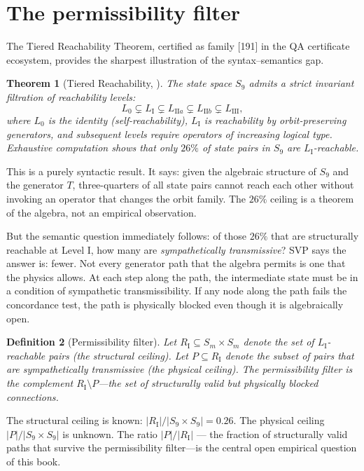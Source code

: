 \documentclass[11pt,a4paper]{article}
\newtheorem{theorem}{Theorem}
\newtheorem{definition}[theorem]{Definition}
\begin{document}
\section{The permissibility filter}

The Tiered Reachability Theorem, certified as family [191] in the QA
certificate ecosystem, provides the sharpest illustration of the
syntax--semantics gap.

\begin{theorem}[Tiered Reachability, {\cite[Cert 191]{qa_bateson}}]
The state space $S_9$ admits a strict invariant filtration of
reachability levels:
\[
L_0 \subsetneq L_{\mathrm{I}} \subsetneq L_{\mathrm{II}a}
\subsetneq L_{\mathrm{II}b} \subsetneq L_{\mathrm{III}},
\]
where $L_0$ is the identity (self-reachability), $L_{\mathrm{I}}$ is
reachability by orbit-preserving generators, and subsequent levels
require operators of increasing logical type. Exhaustive computation
shows that only $26\%$ of state pairs in $S_9$ are
$L_{\mathrm{I}}$-reachable.
\end{theorem}

This is a purely syntactic result. It says: given the algebraic structure
of $S_9$ and the generator $T$, three-quarters of all state pairs cannot
reach each other without invoking an operator that changes the orbit
family. The $26\%$ ceiling is a theorem of the algebra, not an empirical
observation.

But the semantic question immediately follows: of those $26\%$ that are
structurally reachable at Level I, how many are \emph{sympathetically
transmissive}? SVP says the answer is: fewer. Not every generator path
that the algebra permits is one that the physics allows. At each step
along the path, the intermediate state must be in a condition of
sympathetic transmissibility. If any node along the path fails the
concordance test, the path is physically blocked even though it is
algebraically open.

\begin{definition}[Permissibility filter]
Let $R_{\mathrm{I}} \subseteq S_m \times S_m$ denote the set of
$L_{\mathrm{I}}$-reachable pairs (the structural ceiling). Let
$P \subseteq R_{\mathrm{I}}$ denote the subset of pairs that are
sympathetically transmissive (the physical ceiling). The
\emph{permissibility filter} is the complement
$R_{\mathrm{I}} \setminus P$---the set of structurally valid but
physically blocked connections.
\end{definition}

The structural ceiling is known: $|R_{\mathrm{I}}| / |S_9 \times S_9|
= 0.26$. The physical ceiling $|P| / |S_9 \times S_9|$ is unknown. The
ratio $|P| / |R_{\mathrm{I}}|$ --- the fraction of structurally valid
paths that survive the permissibility filter---is the central open
empirical question of this book.
\end{document}
